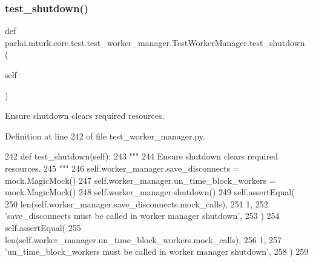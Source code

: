 \subsubsection{\texorpdfstring{test\+\_\+shutdown()}{test\_shutdown()}}
{\footnotesize\ttfamily def parlai.\+mturk.\+core.\+test.\+test\+\_\+worker\+\_\+manager.\+Test\+Worker\+Manager.\+test\+\_\+shutdown (\begin{DoxyParamCaption}\item[{}]{self }\end{DoxyParamCaption})}

\begin{DoxyVerb}Ensure shutdown clears required resources.
\end{DoxyVerb}
 

Definition at line 242 of file test\+\_\+worker\+\_\+manager.\+py.


\begin{DoxyCode}
242     \textcolor{keyword}{def }test\_shutdown(self):
243         \textcolor{stringliteral}{"""}
244 \textcolor{stringliteral}{        Ensure shutdown clears required resources.}
245 \textcolor{stringliteral}{        """}
246         self.worker\_manager.save\_disconnects = mock.MagicMock()
247         self.worker\_manager.un\_time\_block\_workers = mock.MagicMock()
248         self.worker\_manager.shutdown()
249         self.assertEqual(
250             len(self.worker\_manager.save\_disconnects.mock\_calls),
251             1,
252             \textcolor{stringliteral}{'save\_disconnects must be called in worker manager shutdown'},
253         )
254         self.assertEqual(
255             len(self.worker\_manager.un\_time\_block\_workers.mock\_calls),
256             1,
257             \textcolor{stringliteral}{'un\_time\_block\_workers must be called in worker manager shutdown'},
258         )
259 
\end{DoxyCode}
\mbox{\label{classparlai_1_1mturk_1_1core_1_1test_1_1test__worker__manager_1_1TestWorkerManager_a74f50242471b9415cf0e299fcb8bfde1}} 

